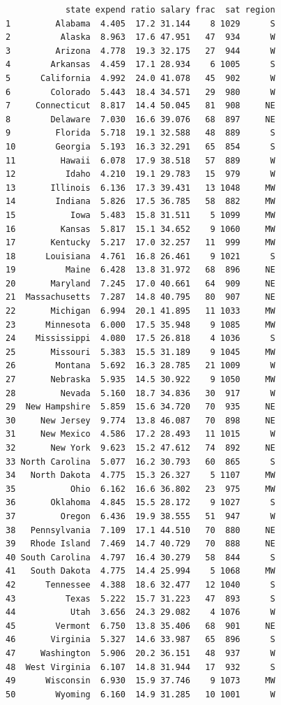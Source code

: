 \documentclass[
  letterpaper,
  DIV=11,
  numbers=noendperiod]{scrreprt}
\begin{document}
\begin{verbatim}
            state expend ratio salary frac  sat region
1         Alabama  4.405  17.2 31.144    8 1029      S
2          Alaska  8.963  17.6 47.951   47  934      W
3         Arizona  4.778  19.3 32.175   27  944      W
4        Arkansas  4.459  17.1 28.934    6 1005      S
5      California  4.992  24.0 41.078   45  902      W
6        Colorado  5.443  18.4 34.571   29  980      W
7     Connecticut  8.817  14.4 50.045   81  908     NE
8        Delaware  7.030  16.6 39.076   68  897     NE
9         Florida  5.718  19.1 32.588   48  889      S
10        Georgia  5.193  16.3 32.291   65  854      S
11         Hawaii  6.078  17.9 38.518   57  889      W
12          Idaho  4.210  19.1 29.783   15  979      W
13       Illinois  6.136  17.3 39.431   13 1048     MW
14        Indiana  5.826  17.5 36.785   58  882     MW
15           Iowa  5.483  15.8 31.511    5 1099     MW
16         Kansas  5.817  15.1 34.652    9 1060     MW
17       Kentucky  5.217  17.0 32.257   11  999     MW
18      Louisiana  4.761  16.8 26.461    9 1021      S
19          Maine  6.428  13.8 31.972   68  896     NE
20       Maryland  7.245  17.0 40.661   64  909     NE
21  Massachusetts  7.287  14.8 40.795   80  907     NE
22       Michigan  6.994  20.1 41.895   11 1033     MW
23      Minnesota  6.000  17.5 35.948    9 1085     MW
24    Mississippi  4.080  17.5 26.818    4 1036      S
25       Missouri  5.383  15.5 31.189    9 1045     MW
26        Montana  5.692  16.3 28.785   21 1009      W
27       Nebraska  5.935  14.5 30.922    9 1050     MW
28         Nevada  5.160  18.7 34.836   30  917      W
29  New Hampshire  5.859  15.6 34.720   70  935     NE
30     New Jersey  9.774  13.8 46.087   70  898     NE
31     New Mexico  4.586  17.2 28.493   11 1015      W
32       New York  9.623  15.2 47.612   74  892     NE
33 North Carolina  5.077  16.2 30.793   60  865      S
34   North Dakota  4.775  15.3 26.327    5 1107     MW
35           Ohio  6.162  16.6 36.802   23  975     MW
36       Oklahoma  4.845  15.5 28.172    9 1027      S
37         Oregon  6.436  19.9 38.555   51  947      W
38   Pennsylvania  7.109  17.1 44.510   70  880     NE
39   Rhode Island  7.469  14.7 40.729   70  888     NE
40 South Carolina  4.797  16.4 30.279   58  844      S
41   South Dakota  4.775  14.4 25.994    5 1068     MW
42      Tennessee  4.388  18.6 32.477   12 1040      S
43          Texas  5.222  15.7 31.223   47  893      S
44           Utah  3.656  24.3 29.082    4 1076      W
45        Vermont  6.750  13.8 35.406   68  901     NE
46       Virginia  5.327  14.6 33.987   65  896      S
47     Washington  5.906  20.2 36.151   48  937      W
48  West Virginia  6.107  14.8 31.944   17  932      S
49      Wisconsin  6.930  15.9 37.746    9 1073     MW
50        Wyoming  6.160  14.9 31.285   10 1001      W
\end{verbatim}
\end{document}
